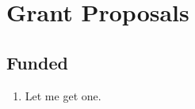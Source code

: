 \section*{Grant Proposals}

\subsection*{Funded}

\begin{enumerate}
    \item Let me get one.
\end{enumerate}
